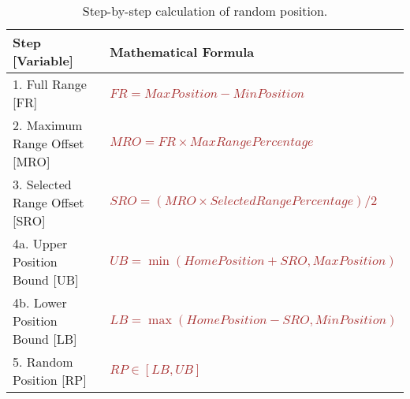 \documentclass{CSSRforAfrica}
\begin{document}
\begin{table}[H]
\centering
\caption{Step-by-step calculation of random position.}
\renewcommand{\arraystretch}{1.3}
\begin{tabularx}{\textwidth}{|>{\raggedright\arraybackslash}X|>{\raggedright\arraybackslash}X|}
\hline
\rowcolor{white}
\textbf{Step [Variable]} & \textbf{Mathematical Formula} \\
\hline
\rowcolor{white}
1. Full Range [FR] & \textcolor{brown}{$FR = MaxPosition - MinPosition$} \\
\hline
\rowcolor{white}
2. Maximum Range Offset [MRO] & \textcolor{brown}{$MRO = FR \times MaxRangePercentage$} \\
\hline
\rowcolor{white}
3. Selected Range Offset [SRO] & \textcolor{brown}{$SRO = (MRO \times SelectedRangePercentage) / 2$} \\
\hline
\rowcolor{white}
4a. Upper Position Bound [UB] & \textcolor{brown}{$UB = \min(HomePosition + SRO, MaxPosition)$} \\
\hline
\rowcolor{white}
4b. Lower Position Bound [LB] & \textcolor{brown}{$LB = \max(HomePosition - SRO, MinPosition)$} \\
\hline
\rowcolor{white}
5. Random Position [RP] & \textcolor{brown}{$RP \in [LB, UB]$} \\
\hline
\end{tabularx}
\label{table}
\end{table}
\end{document}
